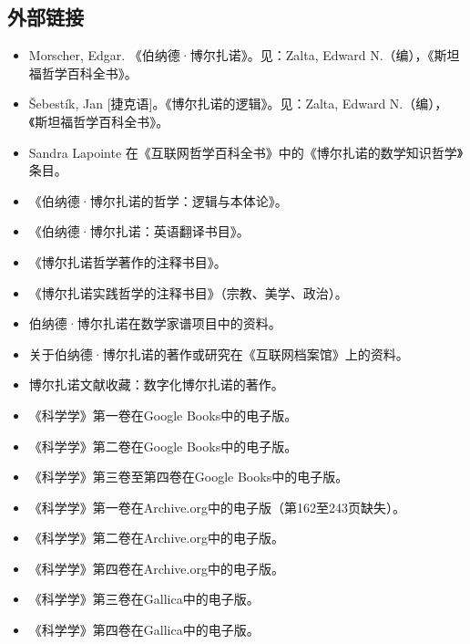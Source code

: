 \subsection{外部链接} 
\begin{itemize}
\item  Morscher, Edgar. 《伯纳德·博尔扎诺》。见：Zalta, Edward N.（编），《斯坦福哲学百科全书》。  
\item  Šebestík, Jan [捷克语]。《博尔扎诺的逻辑》。见：Zalta, Edward N.（编），《斯坦福哲学百科全书》。  
\item  Sandra Lapointe 在《互联网哲学百科全书》中的《博尔扎诺的数学知识哲学》条目。  
\item 《伯纳德·博尔扎诺的哲学：逻辑与本体论》。  
\item 《伯纳德·博尔扎诺：英语翻译书目》。  
\item 《博尔扎诺哲学著作的注释书目》。  
\item 《博尔扎诺实践哲学的注释书目》（宗教、美学、政治）。  
\item 伯纳德·博尔扎诺在数学家谱项目中的资料。  
\item 关于伯纳德·博尔扎诺的著作或研究在《互联网档案馆》上的资料。  
\item 博尔扎诺文献收藏：数字化博尔扎诺的著作。  
\item 《科学学》第一卷在Google Books中的电子版。  
\item 《科学学》第二卷在Google Books中的电子版。  
\item 《科学学》第三卷至第四卷在Google Books中的电子版。  
\item 《科学学》第一卷在Archive.org中的电子版（第162至243页缺失）。  
\item 《科学学》第二卷在Archive.org中的电子版。  
\item 《科学学》第四卷在Archive.org中的电子版。  
\item 《科学学》第三卷在Gallica中的电子版。  
\item 《科学学》第四卷在Gallica中的电子版。
\end{itemize} 
